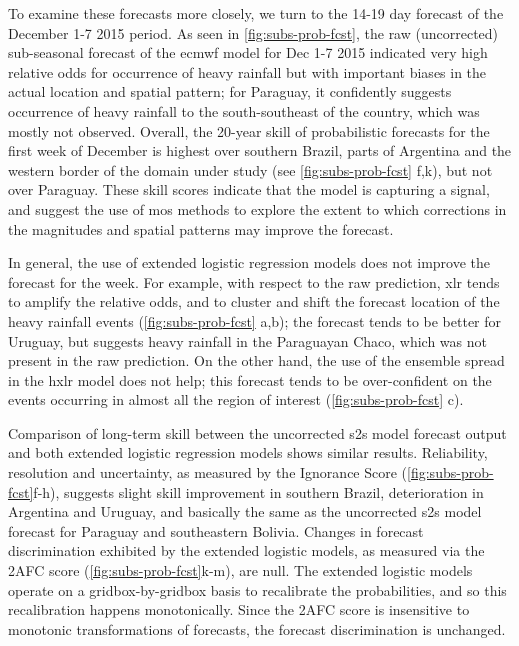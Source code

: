 \documentclass{ametsoc}
\begin{document}
To examine these forecasts more closely, we turn to the 14-19 day forecast of the December 1-7 2015 period.
As seen in \cref{fig:subs-prob-fcst}, the raw (uncorrected) sub-seasonal forecast of the \gls{ecmwf} model for Dec 1-7 2015 indicated very high relative odds for occurrence of heavy rainfall but with important biases in the actual location and spatial pattern; for Paraguay, it confidently suggests occurrence of heavy rainfall to the south-southeast of the country, which was mostly not observed.
Overall, the 20-year skill of probabilistic forecasts for the first week of December is highest over southern Brazil, parts of Argentina and the western border of the domain under study (see \cref{fig:subs-prob-fcst} f,k), but not over Paraguay.
These skill scores indicate that the model is capturing a signal, and suggest the use of \gls{mos} methods to explore the extent to which corrections in the magnitudes and spatial patterns may improve the forecast.

In general, the use of extended logistic regression models does not improve the forecast for the week.
For example, with respect to the raw prediction, \gls{xlr} tends to amplify the relative odds, and to cluster and shift the forecast location of the heavy rainfall events (\cref{fig:subs-prob-fcst} a,b); the forecast tends to be better for Uruguay, but suggests heavy rainfall in the Paraguayan Chaco, which was not present in the raw prediction.
On the other hand, the use of the ensemble spread in the \gls{hxlr} model does not help; this forecast tends to be over-confident on the events occurring in almost all the region of interest (\cref{fig:subs-prob-fcst} c).

Comparison of long-term skill between the uncorrected \gls{s2s} model forecast output and both extended logistic regression models shows similar results.
Reliability, resolution and uncertainty, as measured by the Ignorance Score (\cref{fig:subs-prob-fcst}f-h), suggests slight skill improvement in southern Brazil, deterioration in Argentina and Uruguay, and basically the same as the uncorrected \gls{s2s} model forecast for Paraguay and southeastern Bolivia.
Changes in forecast discrimination exhibited by the extended logistic models, as measured via the 2AFC score (\cref{fig:subs-prob-fcst}k-m), are  null.
The extended logistic models operate on a gridbox-by-gridbox basis to recalibrate the probabilities, and so this recalibration happens monotonically.
Since the 2AFC score is insensitive to monotonic transformations of forecasts, the forecast discrimination is unchanged.
\end{document}

